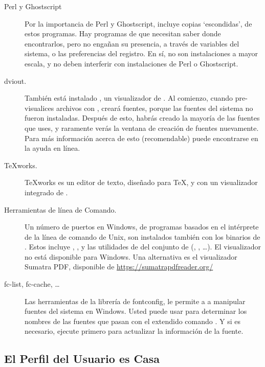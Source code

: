 \documentclass{article}
\begin{document}
\begin{description} 
\item[Perl y Ghostscript] Por la importancia de Perl
			y Ghostscript, \TL{} incluye copias
			`escondidas', de estos programas. Hay programas
			de \TL{} que necesitan saber donde encontrarlos,
			pero no engañan su presencia, a través de
			variables del sistema, o las preferencias del
			registro. En sí, no son instalaciones a mayor
			escala, y no deben interferir con instalaciones
			de Perl o Ghostscript. 

\item[dviout.] También está instalado , un visualizador de
	. Al comienzo, cuando pre-visualices archivos con
	, creará fuentes, porque las fuentes del
	sistema no fueron instaladas. Después de esto, habrás
	creado la mayoría de las fuentes que uses, y raramente
	verás la ventana de creación de fuentes nuevamente. Para
	más información acerca de esto (recomendable) puede
	encontrarse en la ayuda en línea. 

\item[\TeX{}works.] \TeX{}works es un editor de texto, diseñado para
	\TeX{}, y con un visualizador integrado de .

\item[Herramientas de línea de Comando.] Un número de puertos en
	Windows, de programas basados en el intérprete de la línea de
	comando de Unix, son instalados también con los binarios
	de \TL{}. Estos incluye , ,
	y las utilidades de del conjunto de 
	(, , \ldots).  El
	visualizador  no está disponible para
	Windows.  Una alternativa es el visualizador Sumatra
	PDF, disponible de \url{https://sumatrapdfreader.org/} 	

\item[fc-list, fc-cache, \ldots] Las herramientas de la librería de
	fontconfig, le permite a \XeTeX{} a manipular fuentes del
	sistema en Windows. Usted puede usar  para
	determinar los nombres de las fuentes que pasan con el
	extendido comando . Y si es necesario, ejecute		 primero para actualizar la información
	de la fuente.
\end{description}

\subsection{El Perfil del Usuario es Casa}
\label{sec:winhome}
\end{document}
